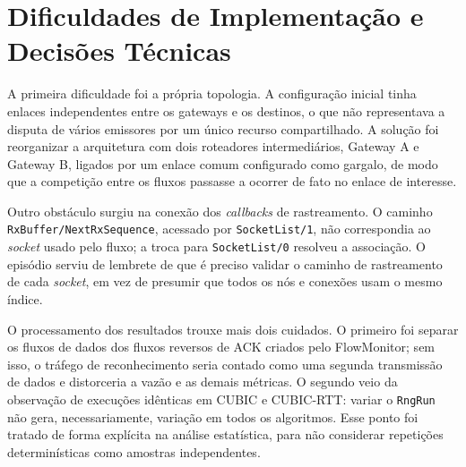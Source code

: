 \section{Dificuldades de Implementação e Decisões Técnicas}

A primeira dificuldade foi a própria topologia. A configuração inicial tinha enlaces independentes entre os gateways e os destinos, o que não representava a disputa de vários emissores por um único recurso compartilhado. A solução foi reorganizar a arquitetura com dois roteadores intermediários, Gateway A e Gateway B, ligados por um enlace comum configurado como gargalo, de modo que a competição entre os fluxos passasse a ocorrer de fato no enlace de interesse.

Outro obstáculo surgiu na conexão dos \textit{callbacks} de rastreamento. O caminho \texttt{RxBuffer/NextRxSequence}, acessado por \texttt{SocketList/1}, não correspondia ao \textit{socket} usado pelo fluxo; a troca para \texttt{SocketList/0} resolveu a associação. O episódio serviu de lembrete de que é preciso validar o caminho de rastreamento de cada \textit{socket}, em vez de presumir que todos os nós e conexões usam o mesmo índice.

O processamento dos resultados trouxe mais dois cuidados. O primeiro foi separar os fluxos de dados dos fluxos reversos de ACK criados pelo FlowMonitor; sem isso, o tráfego de reconhecimento seria contado como uma segunda transmissão de dados e distorceria a vazão e as demais métricas. O segundo veio da observação de execuções idênticas em CUBIC e CUBIC-RTT: variar o \texttt{RngRun} não gera, necessariamente, variação em todos os algoritmos. Esse ponto foi tratado de forma explícita na análise estatística, para não considerar repetições determinísticas como amostras independentes.
